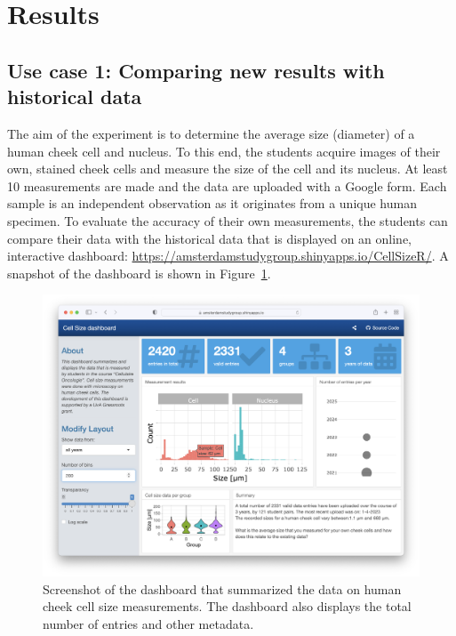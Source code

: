 \documentclass[
]{agujournal2019}
\begin{document}
\hypertarget{sec-results}{%
\section*{Results}\label{sec-results}}

\hypertarget{use-case-1-comparing-new-results-with-historical-data}{%
\subsection*{Use case 1: Comparing new results with historical
data}\label{use-case-1-comparing-new-results-with-historical-data}}

The aim of the experiment is to determine the average size (diameter) of
a human cheek cell and nucleus. To this end, the students acquire images
of their own, stained cheek cells and measure the size of the cell and
its nucleus. At least 10 measurements are made and the data are uploaded
with a Google form. Each sample is an independent observation as it
originates from a unique human specimen. To evaluate the accuracy of
their own measurements, the students can compare their data with the
historical data that is displayed on an online, interactive dashboard:
\url{https://amsterdamstudygroup.shinyapps.io/CellSizeR/}. A snapshot of
the dashboard is shown in Figure~\ref{fig-dashboard}.

\begin{figure}

{\centering \includegraphics{images/Dashboard_230828.png}

}

\caption{\label{fig-dashboard}Screenshot of the dashboard that
summarized the data on human cheek cell size measurements. The dashboard
also displays the total number of entries and other metadata.}

\end{figure}
\end{document}
